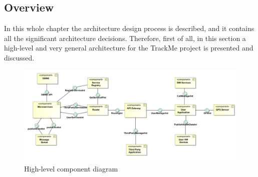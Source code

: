 \subsection{Overview}
In this whole chapter the architecture design process is described, and it contains all the significant
architecture decisions. 
Therefore, first of all, in this section a high-level and very general architecture for the TrackMe 
project is presented and discussed.  

\begin{figure}[H]
\includegraphics[width=\linewidth]{Images/highlevelcd.pdf}
\caption{ High-level component diagram }
\label{fig:highlevelcomponentdiagram}
\end{figure}

